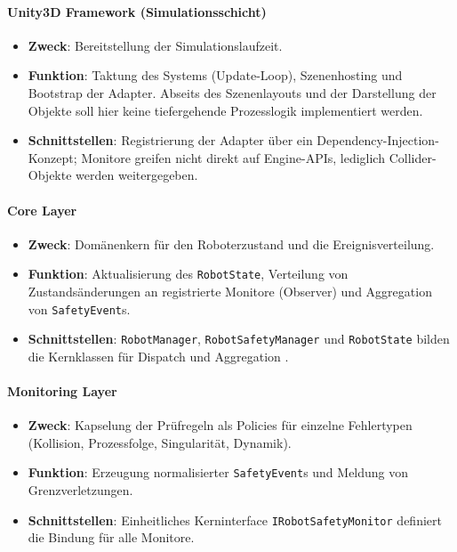 
\paragraph{Unity3D Framework (Simulationsschicht)}
\begin{itemize}
  \item \textbf{Zweck}: Bereitstellung der Simulationslaufzeit.
  \item \textbf{Funktion}: Taktung des Systems (Update-Loop),
    Szenenhosting und Bootstrap der Adapter. Abseits des
    Szenenlayouts und der Darstellung der Objekte soll hier keine
    tiefergehende Prozesslogik implementiert werden.
  \item \textbf{Schnittstellen}: Registrierung der Adapter über ein
    Dependency-Injection-Konzept; Monitore greifen nicht direkt auf
    Engine-APIs, lediglich Collider-Objekte werden weitergegeben.
\end{itemize}

\paragraph{Core Layer}
\begin{itemize}
  \item \textbf{Zweck}: Domänenkern für den Roboterzustand und die
    Ereignisverteilung.
  \item \textbf{Funktion}: Aktualisierung des
    \texttt{RobotState}, Verteilung von Zustandsänderungen an
    registrierte Monitore (Observer) und Aggregation von \texttt{SafetyEvent}s.
  \item \textbf{Schnittstellen}: \texttt{RobotManager},
    \texttt{RobotSafetyManager} und \texttt{RobotState} bilden die
    Kernklassen für Dispatch und Aggregation .
\end{itemize}

\paragraph{Monitoring Layer}
\begin{itemize}
  \item \textbf{Zweck}: Kapselung der Prüfregeln als Policies für
    einzelne Fehlertypen (Kollision, Prozessfolge, Singularität, Dynamik).
  \item \textbf{Funktion}: Erzeugung normalisierter
    \texttt{SafetyEvent}s und Meldung von Grenzverletzungen.
  \item \textbf{Schnittstellen}: Einheitliches Kerninterface
    \texttt{IRobotSafetyMonitor} definiert die Bindung für alle Monitore.
\end{itemize}

